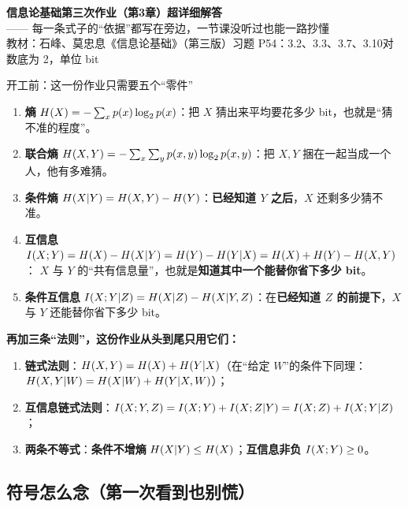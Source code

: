 \documentclass[11pt,a4paper]{ctexart}
\begin{document}
\begin{center}
{\LARGE\bfseries 信息论基础\quad 第三次作业（第3章）超详细解答}\\[7pt]
{\large —— 每一条式子的“依据”都写在旁边，一节课没听过也能一路抄懂}\\[7pt]
{\small 教材：石峰、莫忠息《信息论基础》（第三版）\quad 习题 P54：3.2、3.3、3.7、3.10\quad 对数底为 2，单位 bit}
\end{center}

\begin{idea}{开工前：这一份作业只需要五个“零件”}
\begin{enumerate}[leftmargin=1.8em,itemsep=2pt,topsep=2pt]
  \item \textbf{熵} $H\!\left(X\right)=-\sum_x p\!\left(x\right)\log_{2}p\!\left(x\right)$：把 $X$ 猜出来平均要花多少 bit，也就是“猜不准的程度”。
  \item \textbf{联合熵} $H\!\left(X,Y\right)=-\sum_x\sum_y p\!\left(x,y\right)\log_{2}p\!\left(x,y\right)$：把 $X,Y$ 捆在一起当成一个人，他有多难猜。
  \item \textbf{条件熵} $H\!\left(X|Y\right)=H\!\left(X,Y\right)-H\!\left(Y\right)$：\textbf{已经知道 $Y$ 之后}，$X$ 还剩多少猜不准。
  \item \textbf{互信息} $\I{X;Y}=\Hx{X}-\Hx{X|Y}=\Hx{Y}-\Hx{Y|X}=\Hx{X}+\Hx{Y}-\Hx{X,Y}$：
        $X$ 与 $Y$ 的“共有信息量”，也就是\textbf{知道其中一个能替你省下多少 bit}。
  \item \textbf{条件互信息} $I\!\left(X;Y|Z\right)=H\!\left(X|Z\right)-H\!\left(X|Y,Z\right)$：在\textbf{已经知道 $Z$ 的前提下}，$X$ 与 $Y$ 还能替你省下多少 bit。
\end{enumerate}
\textbf{再加三条“法则”，这份作业从头到尾只用它们：}
\begin{enumerate}[label=(\alph*),leftmargin=1.8em,itemsep=1pt,topsep=2pt]
  \item \textbf{链式法则}：$H\!\left(X,Y\right)=H\!\left(X\right)+H\!\left(Y|X\right)$（在“给定 $W$”的条件下同理：$H\!\left(X,Y|W\right)=H\!\left(X|W\right)+H\!\left(Y|X,W\right)$）；
  \item \textbf{互信息链式法则}：$I\!\left(X;Y,Z\right)=I\!\left(X;Y\right)+I\!\left(X;Z|Y\right)=I\!\left(X;Z\right)+I\!\left(X;Y|Z\right)$；
  \item \textbf{两条不等式}：\textbf{条件不增熵} $H\!\left(X|Y\right)\le H\!\left(X\right)$；\textbf{互信息非负} $I\!\left(X;Y\right)\ge0$。
\end{enumerate}
\end{idea}

\subsection*{符号怎么念（第一次看到也别慌）}
\end{document}
